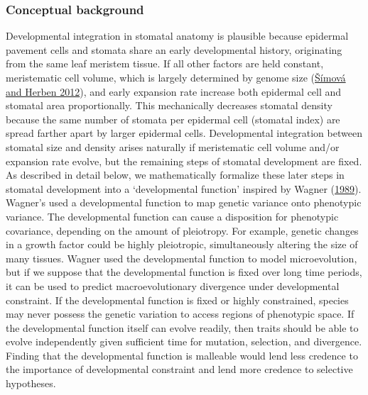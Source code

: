 \documentclass[
  12pt,
]{article}
\begin{document}
\hypertarget{conceptual-background}{%
\subsubsection{Conceptual background}\label{conceptual-background}}

Developmental integration in stomatal anatomy is plausible because epidermal pavement cells and stomata share an early developmental history, originating from the same leaf meristem tissue. If all other factors are held constant, meristematic cell volume, which is largely determined by genome size (\protect\hyperlink{ref-simova_geometrical_2012}{Šímová and Herben 2012}), and early expansion rate increase both epidermal cell and stomatal area proportionally. This mechanically decreases stomatal density because the same number of stomata per epidermal cell (stomatal index) are spread farther apart by larger epidermal cells. Developmental integration between stomatal size and density arises naturally if meristematic cell volume and/or expansion rate evolve, but the remaining steps of stomatal development are fixed. As described in detail below, we mathematically formalize these later steps in stomatal development into a `developmental function' inspired by Wagner (\protect\hyperlink{ref-wagner_multivariate_1989}{1989}). Wagner's used a developmental function to map genetic variance onto phenotypic variance. The developmental function can cause a disposition for phenotypic covariance, depending on the amount of pleiotropy. For example, genetic changes in a growth factor could be highly pleiotropic, simultaneously altering the size of many tissues. Wagner used the developmental function to model microevolution, but if we suppose that the developmental function is fixed over long time periods, it can be used to predict macroevolutionary divergence under developmental constraint. If the developmental function is fixed or highly constrained, species may never possess the genetic variation to access regions of phenotypic space. If the developmental function itself can evolve readily, then traits should be able to evolve independently given sufficient time for mutation, selection, and divergence. Finding that the developmental function is malleable would lend less credence to the importance of developmental constraint and lend more credence to selective hypotheses.
\end{document}
